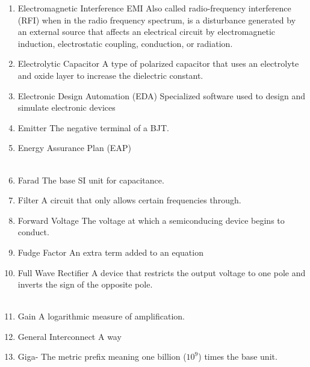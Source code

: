 \documentclass{IEEEtran}
\begin{document}
\begin{enumerate}
\\
\item Electromagnetic Interference {EMI}
\subitem Also called radio-frequency interference (RFI) when in the radio frequency spectrum, is a disturbance generated by an external source that affects an electrical circuit by electromagnetic induction, electrostatic coupling, conduction, or radiation.\\ 
\item Electrolytic Capacitor
  \subitem A type of polarized capacitor that uses an electrolyte and oxide layer to increase the dielectric constant.\\
\item Electronic Design Automation (EDA)
  \subitem Specialized software used to design and simulate electronic devices\\
\item Emitter
  \subitem The negative terminal of a BJT.\\ 
\item Energy Assurance Plan (EAP)
  \subitem \\

\\
\item Farad
  \subitem The base SI unit for capacitance. 
\item Filter
  \subitem A circuit that only allows certain frequencies through.
\item Forward Voltage
  \subitem The voltage at which a semiconducing device begins to conduct.\\
\item Fudge Factor
  \subitem An extra term added to an equation
\item Full Wave Rectifier
  \subitem A device that restricts the output voltage to one pole and inverts the sign of the opposite pole.\\

\\
\item Gain
  \subitem A logarithmic measure of amplification.\\
\item General Interconnect
\subitem A way \\ 
\item Giga-
  \subitem The metric prefix meaning one billion ($10^{9}$) times the base unit.\\


\end{enumerate}
\end{document}
